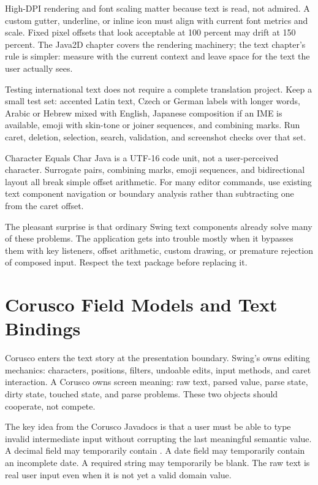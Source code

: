 High-DPI rendering and font scaling matter because text is read, not admired. A custom gutter, underline, or inline icon must align with current font metrics and scale. Fixed pixel offsets that look acceptable at 100 percent may drift at 150 percent. The Java2D chapter covers the rendering machinery; the text chapter's rule is simpler: measure with the current context and leave space for the text the user actually sees.

Testing international text does not require a complete translation project. Keep a small test set: accented Latin text, Czech or German labels with longer words, Arabic or Hebrew mixed with English, Japanese composition if an IME is available, emoji with skin-tone or joiner sequences, and combining marks. Run caret, deletion, selection, search, validation, and screenshot checks over that set.

\begin{pitfallbox}{Character Equals Char}
Java  is a UTF-16 code unit, not a user-perceived character. Surrogate pairs, combining marks, emoji sequences, and bidirectional layout all break simple offset arithmetic. For many editor commands, use existing text component navigation or boundary analysis rather than subtracting one from the caret offset.
\end{pitfallbox}

The pleasant surprise is that ordinary Swing text components already solve many of these problems. The application gets into trouble mostly when it bypasses them with key listeners, offset arithmetic, custom drawing, or premature rejection of composed input. Respect the text package before replacing it.

\section{Corusco Field Models and Text Bindings}

Corusco enters the text story at the presentation boundary. Swing's  owns editing mechanics: characters, positions, filters, undoable edits, input methods, and caret interaction. A Corusco  owns screen meaning: raw text, parsed value, parse state, dirty state, touched state, and parse problems. These two objects should cooperate, not compete.

The key idea from the Corusco Javadocs is that a user must be able to type invalid intermediate input without corrupting the last meaningful semantic value. A decimal field may temporarily contain \api{-}. A date field may temporarily contain an incomplete date. A required string may temporarily be blank. The raw text is real user input even when it is not yet a valid domain value.

